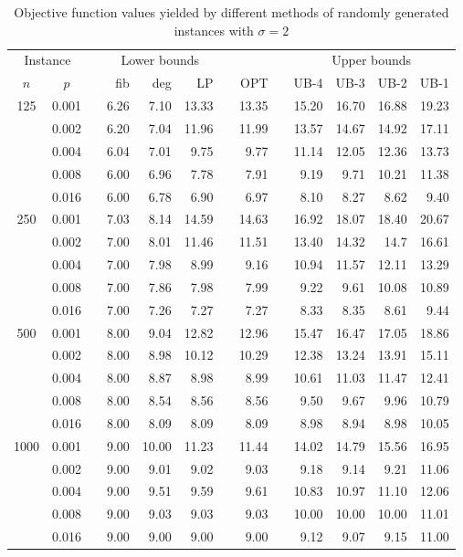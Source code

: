 \begin{footnotesize}
\begin{table}[]
\centering
\begin{tabular}{ccrrrrrrrrrrr}
\multicolumn{2}{c}{Instance} & &\multicolumn{3}{c}{Lower bounds} & & & &\multicolumn{4}{c}{Upper bounds} \\
\cline{1-2}\cline{4-6}\cline{10-13}
$n$ & $p$  &   & fib  & deg  & LP  &  & OPT & & UB-4  & UB-3  & UB-2  & UB-1  \\
\hline
\multirow{5}{*}{125} 
& 0.001 && 6.26 & 7.10 & 13.33 && 13.35 && 15.20 & 16.70 & 16.88 & 19.23 \\
& 0.002 && 6.20 & 7.04 & 11.96 && 11.99 && 13.57 & 14.67 & 14.92 & 17.11 \\
& 0.004 && 6.04 & 7.01 & 9.75  && 9.77  && 11.14 & 12.05 & 12.36 & 13.73 \\
& 0.008 && 6.00 & 6.96 & 7.78  && 7.91  && 9.19  & 9.71  & 10.21 & 11.38 \\
& 0.016 && 6.00 & 6.78 & 6.90  && 6.97  && 8.10  & 8.27  & 8.62  & 9.40  \\
\hline
\multirow{5}{*}{250} 
& 0.001 && 7.03 & 8.14 & 14.59 && 14.63 && 16.92 & 18.07 & 18.40 & 20.67 \\
& 0.002 && 7.00 & 8.01 & 11.46 && 11.51 && 13.40 & 14.32 & 14.7  & 16.61 \\
& 0.004 && 7.00 & 7.98 & 8.99  && 9.16  && 10.94 & 11.57 & 12.11 & 13.29 \\
& 0.008 && 7.00 & 7.86 & 7.98  && 7.99  && 9.22  & 9.61  & 10.08 & 10.89 \\
& 0.016 && 7.00 & 7.26 & 7.27  && 7.27  && 8.33  & 8.35  & 8.61  & 9.44  \\
\hline
\multirow{5}{*}{500} 
& 0.001 && 8.00 & 9.04 & 12.82 &&12.96  &&15.47  & 16.47 & 17.05 & 18.86 \\
& 0.002 && 8.00 & 8.98 & 10.12 &&10.29  &&12.38  & 13.24 & 13.91 & 15.11 \\
& 0.004 && 8.00 & 8.87 & 8.98  &&8.99   &&10.61  & 11.03 & 11.47 & 12.41 \\
& 0.008 && 8.00 & 8.54 & 8.56  &&8.56   &&9.50   & 9.67  & 9.96  & 10.79 \\
& 0.016 && 8.00 & 8.09 & 8.09  &&8.09   &&8.98   & 8.94  & 8.98  & 10.05 \\
\hline
\multirow{5}{*}{1000} 
& 0.001 && 9.00 & 10.00 & 11.23 && 11.44 && 14.02 & 14.79 & 15.56 & 16.95 \\
& 0.002 && 9.00 & 9.01  & 9.02  && 9.03  && 9.18  & 9.14  & 9.21  & 11.06 \\
& 0.004 && 9.00 & 9.51  & 9.59  && 9.61  && 10.83 & 10.97 & 11.10 & 12.06 \\
& 0.008 && 9.00 & 9.03  & 9.03  && 9.03  && 10.00 & 10.00 & 10.00 & 11.01 \\
& 0.016 && 9.00 & 9.00  & 9.00  && 9.00  && 9.12  & 9.07  & 9.15  & 11.00 \\
\end{tabular}
\caption{Objective function values yielded by different methods of randomly generated instances with $\sigma=2$}
\label{tab:obj-s2}
\end{table}


\end{footnotesize}
